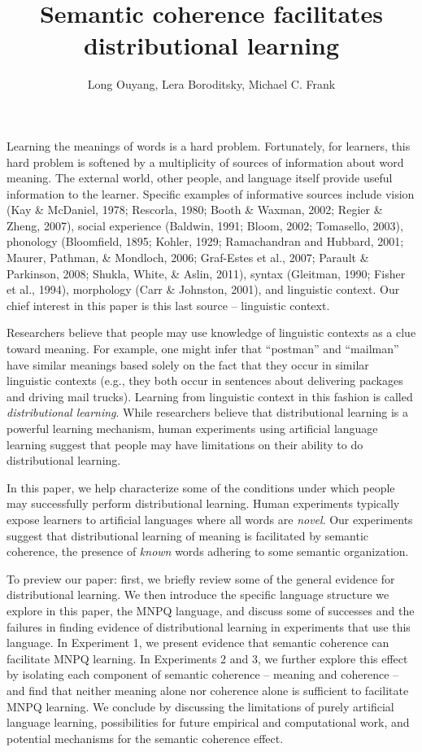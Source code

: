 \documentclass[man,floatsintext]{apa6}
\title{Semantic coherence facilitates distributional learning}
\author{Long Ouyang, Lera Boroditsky, Michael C. Frank}
\affiliation{Stanford University}
\begin{document}
\maketitle

Learning the meanings of words is a hard problem. Fortunately, for
learners, this hard problem is softened by a multiplicity of sources
of information about word meaning. The external world, other people,
and language itself provide useful information to the
learner. Specific examples of informative sources include vision (Kay
\& McDaniel, 1978; Rescorla, 1980; Booth \& Waxman, 2002; Regier \&
Zheng, 2007), social experience (Baldwin, 1991; Bloom, 2002;
Tomasello, 2003), phonology (Bloomfield, 1895; Kohler, 1929;
Ramachandran and Hubbard, 2001; Maurer, Pathman, \& Mondloch, 2006;
Graf-Estes et al., 2007; Parault \& Parkinson, 2008; Shukla, White, \&
Aslin, 2011), syntax (Gleitman, 1990; Fisher et al., 1994), morphology
(Carr \& Johnston, 2001), and linguistic context. Our chief interest
in this paper is this last source -- linguistic context.

Researchers believe that people may use knowledge of linguistic
contexts as a clue toward meaning. For example, one might infer that
``postman'' and ``mailman'' have similar meanings based solely on the
fact that they occur in similar linguistic contexts (e.g., they both
occur in sentences about delivering packages and driving mail
trucks). Learning from linguistic context in this fashion is called
\emph{distributional learning}. While researchers believe that
distributional learning is a powerful learning mechanism, human
experiments using artificial language learning suggest that people may
have limitations on their ability to do distributional learning.
 
In this paper, we help characterize some of the conditions under which
people may successfully perform distributional learning. Human
experiments typically expose learners to artificial languages where
all words are \emph{novel}. Our experiments suggest that
distributional learning of meaning is facilitated by semantic
coherence, the presence of \emph{known} words adhering to some
semantic organization.

To preview our paper: first, we briefly review some of the general
evidence for distributional learning. We then introduce the specific
language structure we explore in this paper, the MNPQ language, and
discuss some of successes and the failures in finding evidence of
distributional learning in experiments that use this language. In
Experiment 1, we present evidence that semantic coherence can
facilitate MNPQ learning. In Experiments 2 and 3, we further explore
this effect by isolating each component of semantic coherence --
meaning and coherence -- and find that neither meaning alone nor
coherence alone is sufficient to facilitate MNPQ learning. We conclude
by discussing the limitations of purely artificial language learning,
possibilities for future empirical and computational work, and
potential mechanisms for the semantic coherence effect.
\end{document}
